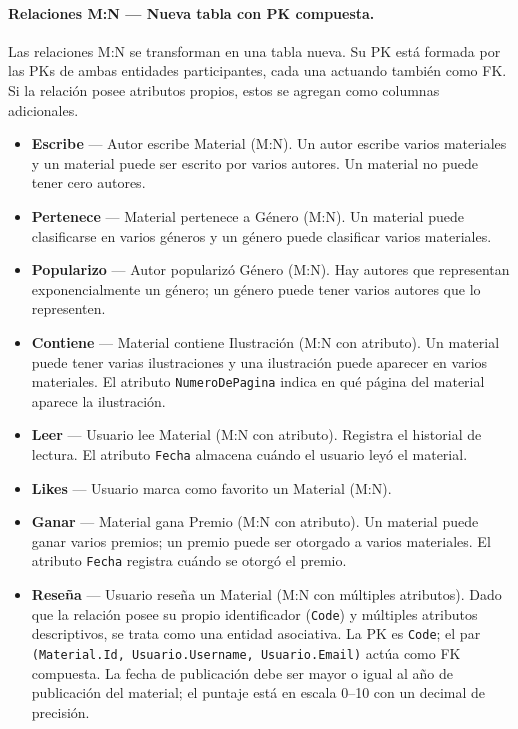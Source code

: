 \documentclass[12pt,a4paper]{article}
\begin{document}
\paragraph{Relaciones M:N — Nueva tabla con PK compuesta.}

Las relaciones M:N se transforman en una tabla nueva. Su PK está formada
por las PKs de ambas entidades participantes, cada una actuando también
como FK. Si la relación posee atributos propios, estos se agregan como
columnas adicionales.

\begin{itemize}

    \item \textbf{Escribe} — Autor escribe Material (M:N). Un autor escribe
    varios materiales y un material puede ser escrito por varios autores.
    Un material no puede tener cero autores.


    \item \textbf{Pertenece} — Material pertenece a Género (M:N). Un material
    puede clasificarse en varios géneros y un género puede clasificar
    varios materiales.


    \item \textbf{Popularizo} — Autor popularizó Género (M:N). Hay autores que
    representan exponencialmente un género; un género puede tener varios
    autores que lo representen.


    \item \textbf{Contiene} — Material contiene Ilustración (M:N con atributo).
    Un material puede tener varias ilustraciones y una ilustración puede
    aparecer en varios materiales. El atributo \texttt{NumeroDePagina} indica
    en qué página del material aparece la ilustración.

    \item \textbf{Leer} — Usuario lee Material (M:N con atributo). Registra el
    historial de lectura. El atributo \texttt{Fecha} almacena cuándo el usuario
    leyó el material.

    \item \textbf{Likes} — Usuario marca como favorito un Material (M:N).

    \item \textbf{Ganar} — Material gana Premio (M:N con atributo). Un material
    puede ganar varios premios; un premio puede ser otorgado a varios materiales.
    El atributo \texttt{Fecha} registra cuándo se otorgó el premio.

    \item \textbf{Reseña} — Usuario reseña un Material (M:N con múltiples atributos).
    Dado que la relación posee su propio identificador (\texttt{Code}) y
    múltiples atributos descriptivos, se trata como una entidad asociativa.
    La PK es \texttt{Code}; el par \texttt{(Material.Id, Usuario.Username,
    Usuario.Email)} actúa como FK compuesta.
    La fecha de publicación debe ser mayor o igual al año de publicación
    del material; el puntaje está en escala 0--10 con un decimal de precisión.

\end{itemize}
\end{document}
